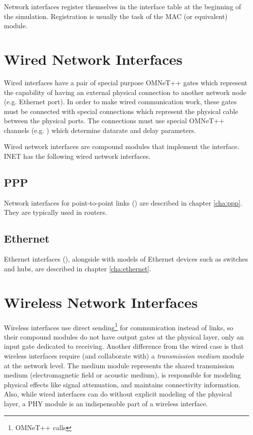 Network interfaces register themselves in the interface table at the
beginning of the simulation. Registration is usually the task of the
MAC (or equivalent) module. 


\section{Wired Network Interfaces}

Wired interfaces have a pair of special purpose OMNeT++ gates which represent
the capability of having an external physical connection to another network
node (e.g. Ethernet port). In order to make wired communication work,
these gates must be connected with special connections which represent the
physical cable between the physical ports. The connections must use special
OMNeT++ channels (e.g. ) which determine datarate
and delay parameters.

Wired network interfaces are compound modules that implement the 
 interface. INET has the following
wired network interfaces. 

\subsection{PPP}

Network interfaces for point-to-point links () are 
described in chapter \ref{cha:ppp}. They are typically used in routers.

\subsection{Ethernet}

Ethernet interfaces (), alongside with models 
of Ethernet devices such as switches and hubs, are described in chapter
\ref{cha:ethernet}.

\section{Wireless Network Interfaces}

Wireless interfaces use direct sending\footnote{OMNeT++  calls} 
for communication instead of links, so their compound modules do not have
output gates at the physical layer, only an input gate dedicated to receiving. 
Another difference from the wired case is that wireless interfaces 
require (and collaborate with) a \textit{transmission medium} module 
at the network level. The medium module represents the shared transmission 
medium (electromagnetic field or acoustic medium), is responsible for 
modeling physical effects like signal attenuation, and maintains 
connectivity information. Also, while wired interfaces can do without
explicit modeling of the physical layer, a PHY module is an indispensable
part of a wireless interface.

